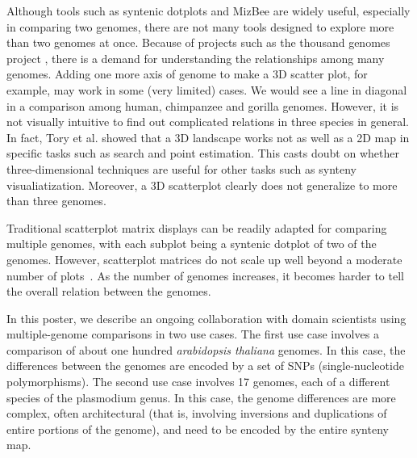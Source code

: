 \documentclass{vgtc}                      %
\begin{document}
Although tools such as syntenic dotplots and MizBee \cite{meyer2009mizbee} are widely useful, especially in comparing two genomes, there are not many tools designed to explore more than two genomes at once. Because of projects such as the thousand genomes project \cite{1000genomes}, there is a demand for understanding the relationships among many genomes.
Adding one more axis of genome to make a 3D scatter plot, for example, may work in some (very limited) cases. We would see a line in diagonal in a comparison among human, chimpanzee and gorilla genomes\cite{synmap3durl}.
However, it is not visually intuitive to find out complicated relations in three species in general. 
In fact, Tory et al. \cite{tory2007spatialization} showed that a 3D landscape works not as well as a 2D map in specific tasks such as search and point estimation.
This casts doubt on whether three-dimensional techniques are useful for other tasks such as synteny visualiatization.
Moreover, a 3D scatterplot clearly does not generalize to more than three genomes.

Traditional scatterplot matrix displays can be readily adapted for comparing multiple genomes, with each subplot being a syntenic dotplot of two of the genomes.
However, scatterplot matrices do not scale up well beyond a moderate number of plots~\cite{}.
As the number of genomes increases, it becomes harder to tell the overall relation between the genomes.

In this poster, we describe an ongoing collaboration with domain scientists using multiple-genome comparisons in two use cases.
%
The first use case involves a comparison of about one hundred \emph{arabidopsis thaliana} genomes. In this case, the differences between the genomes are encoded by
a set of SNPs (single-nucleotide polymorphisms).
%
The second use case involves 17 genomes, each of a different species of the plasmodium genus. In this case, the genome differences are more complex, often architectural (that is, involving inversions and duplications of entire portions of the genome), and need to be encoded by the entire synteny map.
\end{document}
